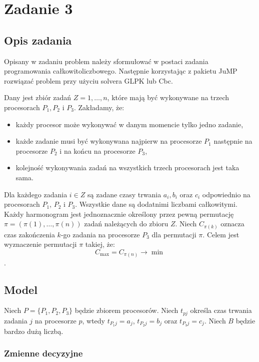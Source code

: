 \documentclass{article}
\begin{document}
    \section{Zadanie 3}
	\subsection{Opis zadania}

    Opisany w zadaniu problem należy sformułować w postaci zadania programowania całkowitoliczbowego. Następnie korzystając z pakietu JuMP 
    rozwiązać problem przy użyciu solvera GLPK lub Cbc.

    Dany jest zbiór zadań $Z={1, \dots, n}$, które mają być wykonywane na trzech procesorach $P_1, P_2$ i $P_3$. Zakładamy, że:
    \begin{itemize}
        \item każdy procesor może wykonywać w danym momencie tylko jedno zadanie,
        \item każde zadanie musi być wykonywana najpierw na procesorze $P_1$ następnie na procesorze $P_2$ i na końcu na procesorze $P_3$,
        \item kolejność wykonywania zadań na wszystkich trzech procesorach jest taka sama.
    \end{itemize}
    Dla każdego zadania $i \in Z$ są zadane czasy trwania $a_i, b_i$ oraz $c_i$ odpowiednio na procesorach $P_1$, $P_2$ i $P_3$. 
    Wszystkie dane są dodatnimi liczbami całkowitymi. Każdy harmonogram jest jednoznacznie określony przez pewną permutację
    $\pi = (\pi(1), \dots, \pi(n))$ zadań należących do zbioru $Z$. Niech $C_{\pi(k)}$ oznacza czas zakończenia $k$-go zadania na 
    procesorze $P_3$ dla permutacji $\pi$. Celem jest wyznaczenie permutacji $\pi$ takiej, że:
    $$C_{\max} = C_{\pi(n)} \rightarrow \min$$.
       
    \subsection{Model}

    Niech $P = \{P_1, P_2, P_3\}$ będzie zbiorem procesorów. Niech $t_{pj}$ określa czas trwania zadania $j$ na procesorze $p$, wtedy 
    $t_{P_1j} = a_j$, $t_{P_2j} = b_j$ oraz $t_{P_3j} = c_j$. Niech $B$ będzie bardzo dużą liczbą.

    \subsubsection{Zmienne decyzyjne}
\end{document}
